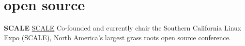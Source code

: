 \section{open source}

\textbf{SCALE}
\newline
\vspace{\parsep}
{ \href{https://socallinuxexpo.org}{SCALE}}
\newline Co-founded and currently chair the Southern California Linux Expo (SCALE), North America's largest grass roots open source conference. 
\vspace{\parsep}
